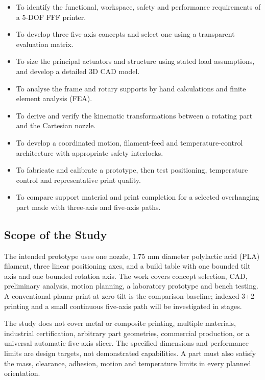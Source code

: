 \documentclass[12pt,a4paper]{article}
\providecommand{\tightlist}{\setlength{\itemsep}{0pt}\setlength{\parskip}{0pt}}
\begin{document}
\begin{itemize}
\tightlist
\item
  To identify the functional, workspace, safety and performance requirements of a 5-DOF FFF printer.
\item
  To develop three five-axis concepts and select one using a transparent evaluation matrix.
\item
  To size the principal actuators and structure using stated load assumptions, and develop a detailed 3D
  CAD model.
\item
  To analyse the frame and rotary supports by hand calculations and finite element analysis (FEA).
\item
  To derive and verify the kinematic transformations between a rotating part and the Cartesian nozzle.
\item
  To develop a coordinated motion, filament-feed and temperature-control architecture with appropriate
  safety interlocks.
\item
  To fabricate and calibrate a prototype, then test positioning, temperature control and representative
  print quality.
\item
  To compare support material and print completion for a selected overhanging part made with three-axis
  and five-axis paths.
\end{itemize}

\subsection{Scope of the Study}\label{scope-of-the-study}

The intended prototype uses one nozzle, 1.75 mm diameter polylactic acid (PLA) filament, three linear
  positioning axes, and a build table with one bounded tilt axis and one bounded rotation axis. The work
  covers concept selection, CAD, preliminary analysis, motion planning, a laboratory prototype and bench
  testing. A conventional planar print at zero tilt is the comparison baseline; indexed 3+2 printing and
  a small continuous five-axis path will be investigated in stages.

The study does not cover metal or composite printing, multiple materials, industrial certification,
  arbitrary part geometries, commercial production, or a universal automatic five-axis slicer. The
  specified dimensions and performance limits are design targets, not demonstrated capabilities. A part
  must also satisfy the mass, clearance, adhesion, motion and temperature limits in every planned
  orientation.
\end{document}
